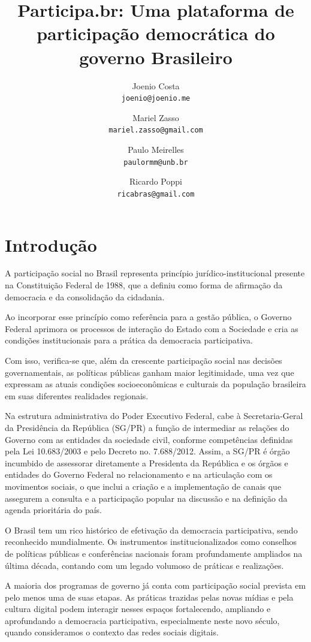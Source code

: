 \documentclass{article}
\title{
  Participa.br: Uma plataforma de participação democrática do governo Brasileiro
}
\author{
  Joenio Costa\\
  \texttt{joenio@joenio.me}
  \and
  Mariel Zasso\\
  \texttt{mariel.zasso@gmail.com}
  \and
  Paulo Meirelles\\
  \texttt{paulormm@unb.br}
  \and
  Ricardo Poppi\\
  \texttt{ricabras@gmail.com}
}
\begin{document}
\maketitle

\section{Introdução}


A participação social no Brasil representa princípio jurídico-institucional
presente na Constituição Federal de 1988, que a definiu como forma de afirmação
da democracia e da consolidação da cidadania. 

Ao incorporar esse princípio como referência para a gestão pública, o Governo
Federal aprimora os processos de interação do Estado com a Sociedade e cria as
condições institucionais para a prática da democracia participativa. 

Com isso, verifica-se que, além da crescente participação social nas decisões
governamentais, as políticas públicas ganham maior legitimidade, uma vez que
expressam as atuais condições socioeconômicas e culturais da população
brasileira em suas diferentes realidades regionais.

Na estrutura administrativa do Poder Executivo Federal, cabe à Secretaria-Geral
da Presidência da República (SG/PR) a função de intermediar as relações do
Governo com as entidades da sociedade civil, conforme competências definidas
pela Lei 10.683/2003 e pelo Decreto no. 7.688/2012. Assim, a SG/PR é órgão
incumbido de assessorar diretamente a Presidenta da República e os órgãos e
entidades do Governo Federal no relacionamento e na articulação com os
movimentos sociais, o que inclui a criação e a implementação de canais que
assegurem a consulta e a participação popular na discussão e na definição da
agenda prioritária do país.

O Brasil tem um rico histórico de efetivação da democracia participativa, sendo
reconhecido mundialmente. Os instrumentos institucionalizados como conselhos de
políticas públicas e conferências nacionais foram profundamente ampliados na
última década, contando com um legado volumoso de práticas e realizações. 

A maioria dos programas de governo já conta com participação social prevista em
pelo menos uma de suas etapas. As práticas trazidas pelas novas mídias e pela
cultura digital podem interagir nesses espaços fortalecendo, ampliando e
aprofundando a democracia participativa, especialmente neste novo século,
quando consideramos o contexto das redes sociais digitais.
\end{document}
